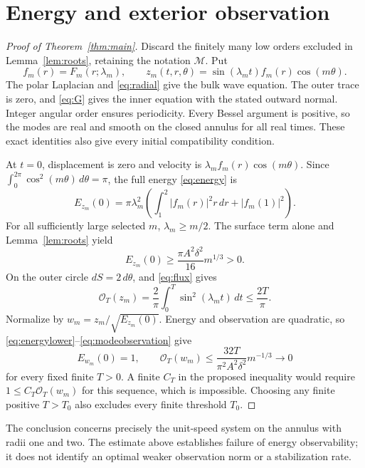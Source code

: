 \documentclass[11pt]{article}
\begin{document}
\section{Energy and exterior observation}

\begin{proof}[Proof of Theorem~\ref{thm:main}]
Discard the finitely many low orders excluded in Lemma~\ref{lem:roots},
retaining the notation \(\mathcal M\). Put
\[
f_m(r)=F_m(r;\lambda_m),\qquad
z_m(t,r,\theta)=\sin(\lambda_m t)f_m(r)\cos(m\theta).
\]
The polar Laplacian and \eqref{eq:radial} give the bulk wave equation.
The outer trace is zero, and \eqref{eq:G} gives the inner equation
with the stated outward normal. Integer angular order ensures periodicity.
Every Bessel argument is positive, so the modes are real and smooth on the
closed annulus for all real times. These exact identities also give every
initial compatibility condition.

At \(t=0\), displacement is zero and velocity is
\(\lambda_m f_m(r)\cos(m\theta)\). Since
\(\int_0^{2\pi}\cos^2(m\theta)\,d\theta=\pi\), the full energy
\eqref{eq:energy} is
\begin{equation}\label{eq:modeenergy}
E_{z_m}(0)=\pi\lambda_m^2
\left(\int_1^2|f_m(r)|^2r\,dr+|f_m(1)|^2\right).
\end{equation}
For all sufficiently large selected \(m\), \(\lambda_m\ge m/2\).
The surface term alone and Lemma~\ref{lem:roots} yield
\begin{equation}\label{eq:energylower}
E_{z_m}(0)\ge\frac{\pi A^2\delta^2}{16}m^{1/3}>0 .
\end{equation}
On the outer circle \(dS=2\,d\theta\), and \eqref{eq:flux} gives
\begin{equation}\label{eq:modeobservation}
\mathcal O_T(z_m)=\frac{2}{\pi}\int_0^T\sin^2(\lambda_m t)\,dt
\le\frac{2T}{\pi}.
\end{equation}
Normalize by \(w_m=z_m/\sqrt{E_{z_m}(0)}\). Energy and observation are
quadratic, so \eqref{eq:energylower}--\eqref{eq:modeobservation} give
\[
E_{w_m}(0)=1,\qquad
\mathcal O_T(w_m)\le\frac{32T}{\pi^2 A^2\delta^2}m^{-1/3}
\longrightarrow0
\]
for every fixed finite \(T>0\). A finite \(C_T\) in the proposed inequality
would require \(1\le C_T\mathcal O_T(w_m)\) for this sequence, which is
impossible. Choosing any finite positive \(T>T_0\) also excludes every
finite threshold \(T_0\).
\end{proof}

The conclusion concerns precisely the unit-speed system on the annulus
with radii one and two. The estimate above establishes failure of energy
observability; it does not identify an optimal weaker observation norm or
a stabilization rate.
\end{document}
